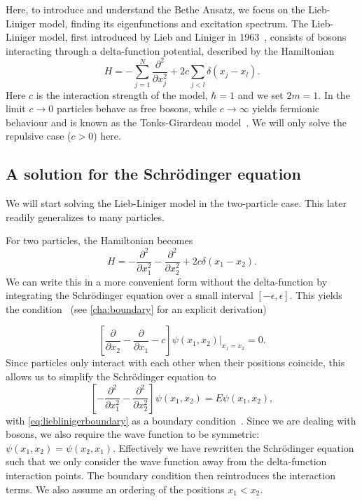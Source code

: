 \documentclass[11pt, a4paper]{report} %
\begin{document}
Here, to introduce and understand the Bethe Ansatz, we focus on the Lieb-Liniger model, finding its eigenfunctions and excitation spectrum.
The Lieb-Liniger model, first introduced by Lieb and Liniger in 1963~\cite{Lieb1963, Lieb1963a}, consists of bosons interacting through a delta-function potential, described by the Hamiltonian
\begin{equation}
	H = - \sum_{j=1}^{N} \frac{\partial^2}{\partial x_j^2} + 2c \sum_{j<l} \delta(x_j - x_l).
\end{equation}
Here \(c\) is the interaction strength of the model, \(\hbar=1\) and we set \(2m=1\).
In the limit \(c\to0\) particles behave as free bosons, while \(c\to\infty\) yields fermionic behaviour and is known as the Tonks-Girardeau model~\cite{Lieb1963, Franchini2017}.
We will only solve the repulsive case (\(c > 0\)) here.

\subsection{A solution for the Schrödinger equation}

We will start solving the Lieb-Liniger model in the two-particle case. This later readily generalizes to many particles.

For two particles, the Hamiltonian becomes
\begin{equation}
	H =  - \frac{\partial^2}{\partial x_1^2} - \frac{\partial^2}{\partial x_2^2} + 2c \delta(x_1 - x_2).
\end{equation}
We can write this in a more convenient form without the delta-function by integrating the Schrödinger equation over a small interval \([-\epsilon,\epsilon]\).
This yields the condition~\cite{Lieb1963} (see \cref{cha:boundary} for an explicit derivation)

\begin{equation}\label{eq:lieblinigerboundary}
	\left[\frac{\partial}{\partial x_2} - \frac{\partial}{\partial x_1} - c\right] \psi(x_1, x_2)\bigg\rvert_{x_1 = x_2} = 0.
\end{equation}
Since particles only interact with each other when their positions coincide, this allows us to simplify the Schrödinger equation to
\begin{equation}\label{eq:lieblinigersimple}
	\left[- \frac{\partial^2}{\partial x_1^2} - \frac{\partial^2}{\partial x_2^2}\right] \psi(x_1, x_2) = E \psi(x_1,x_2),
\end{equation}
with \cref{eq:lieblinigerboundary} as a boundary condition~\cite{Lieb1963}.
Since we are dealing with bosons, we also require the wave function to be symmetric: \(\psi(x_1,x_2) = \psi(x_2,x_1)\).
Effectively we have rewritten the Schrödinger equation such that we only consider the wave function away from the delta-function interaction points.
The boundary condition then reintroduces the interaction terms.
We also assume an ordering of the positions \(x_1 < x_2\).
\end{document}
